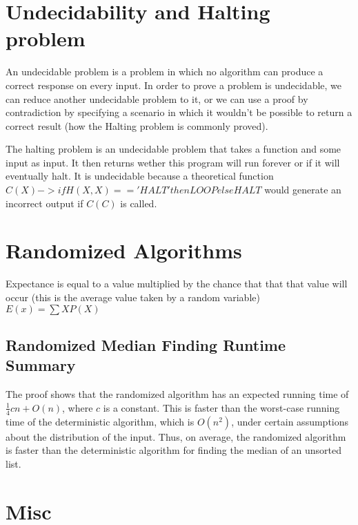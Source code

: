 \documentclass{article}
\begin{document}
\section{Undecidability and Halting problem}
An undecidable problem is a problem in which no algorithm can produce a correct response on every
input. In order to prove a problem is undecidable, we can reduce another undecidable problem to it, 
or we can use a proof by contradiction by specifying a scenario in which it wouldn't be possible
to return a correct result (how the Halting problem is commonly proved).

The halting problem is an undecidable problem that takes a function and some input as input. It then returns
wether this program will run forever or if it will eventually halt. It is undecidable because a theoretical
function $C(X) -> if H(X,X) == 'HALT' then LOOP else HALT$ would generate an incorrect output if $C(C)$ is called.


\section{Randomized Algorithms}
Expectance is equal to a value multiplied by the chance that that that value will occur
(this is the average value taken by a random variable)$E(x) = \sum XP(X)$


\subsection{Randomized Median Finding Runtime Summary}
The proof shows that the randomized algorithm has an expected running time of $\frac{1}{4}cn + O(n)$, where $c$ is a constant. This is faster than the worst-case running time of the deterministic algorithm, which is $O(n^2)$, under certain assumptions about the distribution of the input. Thus, on average, the randomized algorithm is faster than the deterministic algorithm for finding the median of an unsorted list.


\section{Misc}
\end{document}
